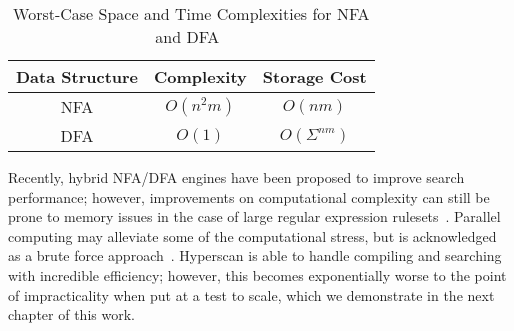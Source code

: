 \begin{table} [ht!]
\caption{Worst-Case Space and Time Complexities for NFA and DFA~\cite{Yu}}
\centering
\begin{tabular}{|c | c | c|}
\hline
\textbf{Data Structure} & \textbf{Complexity} & \textbf{Storage Cost} \\
\hline
NFA & $O(n^{2}m)$ & $O(nm)$ \\
\hline
DFA & $O(1)$ & $O(\Sigma^{nm})$ \\
\hline
\end{tabular}
\label{table:facomplex}
\end{table}

Recently, hybrid NFA/DFA engines have been proposed to improve search performance; however, improvements on computational complexity can still be prone to memory issues in the case of large regular expression rulesets~\cite{hyperscan}. Parallel computing may alleviate some of the computational stress, but is acknowledged as a brute force approach~\cite{Fu}. Hyperscan is able to handle compiling and searching with incredible efficiency; however, this becomes exponentially worse to the point of impracticality when put at a test to scale, which we demonstrate in the next chapter of this work.
